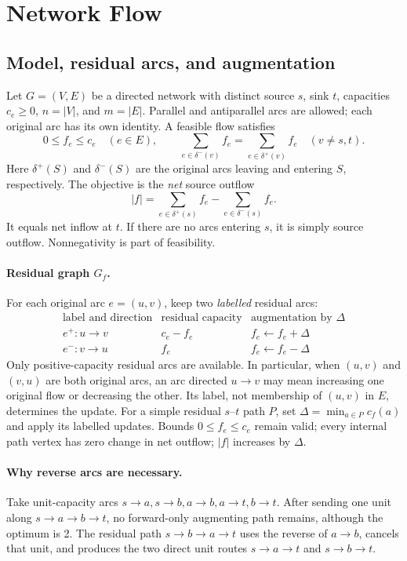 \documentclass[10pt]{article}
\theoremstyle{definition}
\begin{document}
\clearpage

\section{Network Flow}\label{nf:chapter}

\subsection{Model, residual arcs, and augmentation}\label{nf:model}
Let $G=(V,E)$ be a directed network with distinct source $s$, sink $t$,
capacities $c_e\ge0$, $n=|V|$, and $m=|E|$. Parallel and antiparallel arcs
are allowed; each original arc has its own identity. A feasible flow satisfies
\[
  0\le f_e\le c_e\quad(e\in E),\qquad
  \sum_{e\in\delta^-(v)}f_e=\sum_{e\in\delta^+(v)}f_e
  \quad(v\ne s,t).
\]
Here $\delta^+(S)$ and $\delta^-(S)$ are the original arcs leaving and entering
$S$, respectively. The objective is the \emph{net} source outflow
\[
  |f|=\sum_{e\in\delta^+(s)}f_e-\sum_{e\in\delta^-(s)}f_e.
\]
It equals net inflow at $t$. If there are no arcs entering $s$, it is simply
source outflow. Nonnegativity is part of feasibility.

\paragraph{Residual graph $G_f$.}
For each original arc $e=(u,v)$, keep two \emph{labelled} residual arcs:
\[
\begin{array}{c|c|c}
\text{label and direction}&\text{residual capacity}&\text{augmentation by }\Delta\\\hline
 e^+:u\to v&c_e-f_e&f_e\gets f_e+\Delta\\
 e^-:v\to u&f_e&f_e\gets f_e-\Delta
\end{array}
\]
Only positive-capacity residual arcs are available. In particular, when
$(u,v)$ and $(v,u)$ are both original arcs, an arc directed $u\to v$ may
mean increasing one original flow or decreasing the other. Its label, not
membership of $(u,v)$ in $E$, determines the update.
For a simple residual $s$--$t$ path $P$, set
$\Delta=\min_{a\in P}c_f(a)$ and apply its labelled updates.
Bounds $0\le f_e\le c_e$ remain valid; every internal path vertex has zero
change in net outflow; $|f|$ increases by $\Delta$.

\paragraph{Why reverse arcs are necessary.}
Take unit-capacity arcs $s\to a,s\to b,a\to b,a\to t,b\to t$.
After sending one unit along $s\to a\to b\to t$, no forward-only
augmenting path remains, although the optimum is 2. The residual path
$s\to b\to a\to t$ uses the reverse of $a\to b$, cancels that unit, and
produces the two direct unit routes $s\to a\to t$ and $s\to b\to t$.
\end{document}
